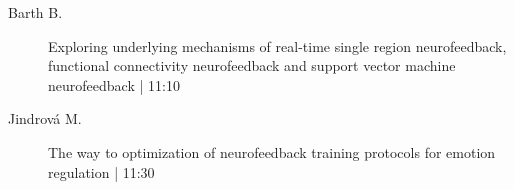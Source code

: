 \begin{symposium}
\begin{description}
                \item [ Barth B.] Exploring underlying mechanisms of real-time single region neurofeedback, functional connectivity neurofeedback and support vector machine neurofeedback \textcolor{mygray}{ | 11:10}    
                
                \item [ Jindrová M.] The way to optimization of neurofeedback training protocols for emotion regulation \textcolor{mygray}{ | 11:30}    
                
            \end{description} 
            \end{symposium}
            
